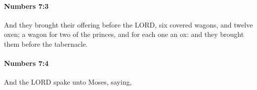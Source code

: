 		\paragraph{Numbers 7:3} %
			\label{NUMBERS-7-3}

			And they brought their offering before the LORD, six covered wagons, and twelve oxen; a wagon for two of the princes, and for each one an ox: and they brought them before the tabernacle.


		\paragraph{Numbers 7:4} %
			\label{NUMBERS-7-4}

			And the LORD spake unto Moses, saying,


